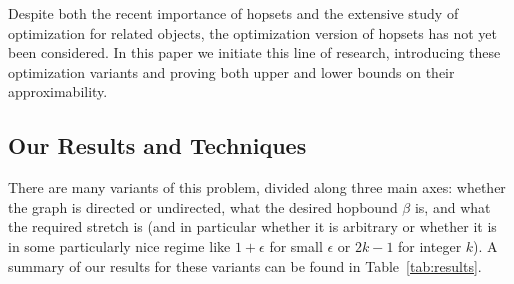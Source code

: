 \documentclass{article}
\theoremstyle{definition}
\theoremstyle{remark}
\begin{document}
Despite both the recent importance of hopsets and the extensive study of optimization for related objects, the optimization version of hopsets has not yet been considered.  In this paper we initiate this line of research, introducing these optimization variants and proving both upper and lower bounds on their approximability. 

\subsection{Our Results and Techniques}
There are many variants of this problem, divided along three main axes: whether the graph is directed or undirected, what the desired hopbound $\beta$ is, and what the required stretch is (and in particular whether it is arbitrary or whether it is in some particularly nice regime like $1+\epsilon$ for small $\epsilon$ or $2k-1$ for integer $k$).  A summary of our results for these variants can be found in Table~\ref{tab:results}.
\end{document}
